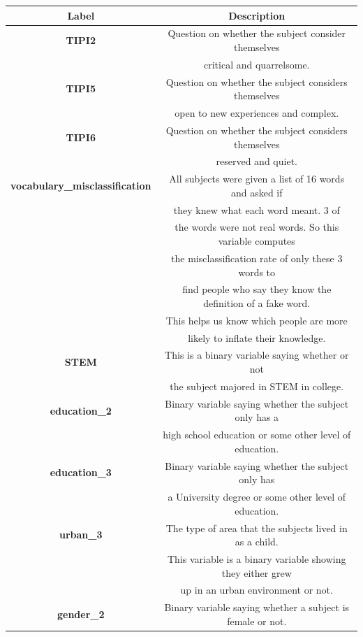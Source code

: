 \documentclass[11pt]{article}
\begin{document}
    \begin{tabular}{ c|c }
        Label & Description \\
        \hline
        \textbf{TIPI2} & Question on whether the subject consider themselves \\ & critical and quarrelsome. \\
        \hline
        \textbf{TIPI5} & Question on whether the subject considers themselves \\ & open to new experiences and complex. \\
        \hline
        \textbf{TIPI6} & Question on whether the subject considers themselves \\ & reserved and quiet. \\
        \hline
        \textbf{vocabulary\_misclassification} & All subjects were given a list of 16 words and asked if \\ & they knew what each word meant. 3 of \\ & the words were not real words. So this variable computes \\ & the misclassification rate of only these 3 words to \\ & find people who say they know the definition of a fake word. \\ & This helps us know which people are more \\ & likely to inflate their knowledge. \\
        \hline
        \textbf{STEM} & This is a binary variable saying whether or not \\ & the subject majored in STEM in college. \\
        \hline
        \textbf{education\_2} & Binary variable saying whether the subject only has a \\ & high school education or some other level of education. \\
        \hline
        \textbf{education\_3}  & Binary variable saying whether the subject only has \\ & a University degree or some other level of education. \\
        \hline
        \textbf{urban\_3} & The type of area that the subjects lived in as a child. \\ & This variable is a binary variable showing they either grew \\ & up in an urban environment or not. \\
        \hline
        \textbf{gender\_2} & Binary variable saying whether a subject is female or not. \\

\end{tabular}
\end{document}
